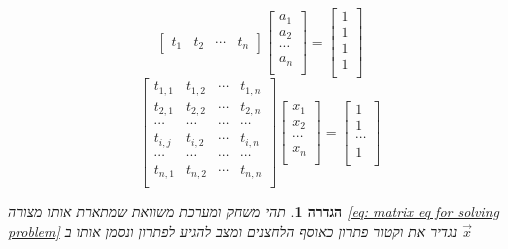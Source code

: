 \documentclass[12pt,twoside]{article}
\newtheorem{definition}{הגדרה}[section]
\begin{document}
\begin{equation*}
    \begin{bmatrix}
        t_1 & t_2 & \cdots & t_n
    \end{bmatrix}
    \begin{bmatrix}
        a_1 \\
        a_2 \\
        \cdots \\
        a_n \\
    \end{bmatrix}
    =
    \begin{bmatrix}
        1 \\
        1 \\
        1 \\
        1 \\
    \end{bmatrix}
\end{equation*}
\begin{equation}
    \label{eq: matrix eq for solving problem}
    \begin{bmatrix}
        t_{1,1} & t_{1,2} & \cdots & t_{1,n} \\
        t_{2,1} & t_{2,2} & \cdots & t_{2,n} \\
        \cdots & \cdots & \cdots & \cdots\\
        t_{i,j} & t_{i,2} & \cdots & t_{i,n} \\
        \cdots & \cdots & \cdots & \cdots\\
        t_{n,1} & t_{n,2} & \cdots & t_{n,n} \\
    \end{bmatrix}
    \begin{bmatrix}
        x_1 \\
        x_2 \\
        \cdots \\
        x_n \\
    \end{bmatrix}
    = 
    \begin{bmatrix}
        1 \\
        1 \\
        \cdots \\
        1 \\
    \end{bmatrix}
\end{equation}


\begin{definition}
    \label{ def: solution vector}
    תהי משחק ומערכת משוואת שמתארת אותו מצורה 
    \ref{eq: matrix eq for solving problem} 
    נגדיר את וקטור פתרון כאוסף הלחצנים ומצב להגיע לפתרון
    ונסמן אותו ב
    $\vec{x}$
\end{definition}
\end{document}
